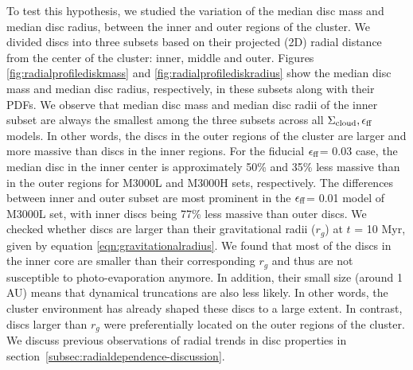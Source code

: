 \documentclass[fleqn,usenatbib]{mnras}
\newcommand\sfeff{\ensuremath{\epsilon_{\rm ff}}\xspace}   %
\newcommand\Sigmacloud{\ensuremath{\Sigma_{\rm cloud}}\xspace} %
\begin{document}
To test this hypothesis, we studied the variation of the median disc mass and median disc radius, between the inner and outer regions of the cluster. We divided discs into three subsets based on their projected (2D) radial distance from the center of the cluster: inner, middle and outer. Figures \ref{fig:radialprofilediskmass} and \ref{fig:radialprofilediskradius} show the median disc mass and median disc radius, respectively, in these subsets along with their PDFs. We observe that median disc mass and median disc radii of the inner subset are always the smallest among the three subsets across all $\Sigmacloud, \sfeff$ models. In other words, the discs in the outer regions of the cluster are larger and more massive than discs in the inner regions. For the fiducial \sfeff = 0.03 case, the median disc in the inner center is approximately 50\% and 35\% less massive than in the outer regions for M3000L and M3000H sets, respectively. The differences between inner and outer subset are most prominent in the \sfeff = 0.01 model of M3000L set, with inner discs being 77\% less massive than outer discs. We checked whether discs are larger than their gravitational radii ($r_g$) at $t$ = 10 Myr, given by equation \ref{eqn:gravitationalradius}. We found that most of the discs in the inner core are smaller than their corresponding $r_{g}$ and thus are not susceptible to photo-evaporation anymore. In addition, their small size (around 1 AU) means that dynamical truncations are also less likely. In other words, the cluster environment has already shaped these discs to a large extent. In contrast, discs larger than $r_g$ were preferentially located on the outer regions of the cluster. We discuss previous observations of radial trends in disc properties in section~\ref{subsec:radialdependence-discussion}.

\end{document}
